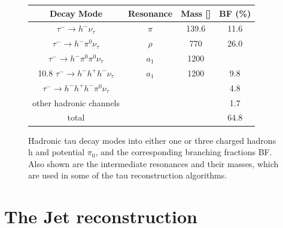 \begin{figure}[tbh!]
	\begin{center}	
			\begin{tabular}{ | c | c | c | c |}
				\hline
				Decay Mode & Resonance & Mass [\mev] & BF (\%) \\ \hline
				\hline
				$\tau^{-}\longrightarrow h^{-}\nu_{\tau}$& $\pi$ & 139.6 & 11.6 \\ \hline
				$\tau^{-}\longrightarrow h^{-}\pi^{0}\nu_{\tau}$& $\rho$ & 770 & 26.0 \\ \hline
				$\tau^{-}\longrightarrow h^{-}\pi^{0}\pi^{0}\nu_{\tau}$ & $a_{1}$ & 1200 & \\ 10.8 \hline
				$\tau^{-}\longrightarrow h^{-} h^{+} h^{-} \nu_{\tau}$& $a_{1}$& 1200 & 9.8 \\ \hline
				$\tau^{-}\longrightarrow h^{-} h^{+} h^{-} \pi^{0}\nu_{\tau}$& & & 4.8 \\ \hline
				other hadronic channels& & & 1.7 \\ \hline
				\hline
				total & & & 64.8 \\ \hline
				\hline
			\end{tabular}
		\caption{ Hadronic tau decay modes into either one or three charged hadrons h and potential $\pi_{0}$, and the corresponding branching fractions BF. Also shown are the intermediate resonances and their masses, which are used in some of the tau reconstruction algorithms.}
		\label{table:tau_hdecay}
	\end{center}
\end{figure}

\section {The Jet reconstruction}

